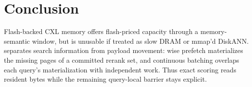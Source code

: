 \section{Conclusion}
\label{sec:concl}

Flash-backed CXL memory offers flash-priced capacity through a memory-semantic window, but is unusable if treated as slow DRAM or mmap'd DiskANN.
\sys{} separates search information from payload movement: wise prefetch materializes the missing pages of a committed rerank set, and continuous batching overlaps each query's materialization with independent work.
Thus exact scoring reads resident bytes while the remaining query-local barrier stays explicit.
